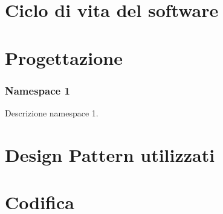 \section{Ciclo di vita del software}
\label{sec:ciclo-vita-software}

\section{Progettazione}
\label{sec:progettazione}

\subsubsection{Namespace 1} %
Descrizione namespace 1.

\begin{namespacedesc}
\end{namespacedesc}


\section{Design Pattern utilizzati}

\section{Codifica}

